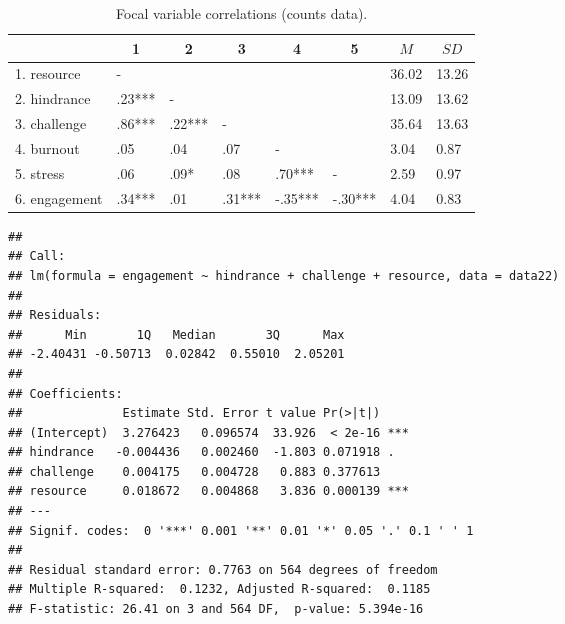 \documentclass[
  man]{apa6}
\begin{document}
\begin{table}[tbp]

\begin{center}
\begin{threeparttable}

\caption{\label{tab:correlation_table}Focal variable correlations (counts data).}

\begin{tabular}{llllllll}
\toprule
 & \multicolumn{1}{c}{1} & \multicolumn{1}{c}{2} & \multicolumn{1}{c}{3} & \multicolumn{1}{c}{4} & \multicolumn{1}{c}{5} & \multicolumn{1}{c}{$M$} & \multicolumn{1}{c}{$SD$}\\
\midrule
1. resource & - &  &  &  &  & 36.02 & 13.26\\
2. hindrance & .23*** & - &  &  &  & 13.09 & 13.62\\
3. challenge & .86*** & .22*** & - &  &  & 35.64 & 13.63\\
4. burnout & .05 & .04 & .07 & - &  & 3.04 & 0.87\\
5. stress & .06 & .09* & .08 & .70*** & - & 2.59 & 0.97\\
6. engagement & .34*** & .01 & .31*** & -.35*** & -.30*** & 4.04 & 0.83\\
\bottomrule
\end{tabular}

\end{threeparttable}
\end{center}

\end{table}

\begin{verbatim}
## 
## Call:
## lm(formula = engagement ~ hindrance + challenge + resource, data = data22)
## 
## Residuals:
##      Min       1Q   Median       3Q      Max 
## -2.40431 -0.50713  0.02842  0.55010  2.05201 
## 
## Coefficients:
##              Estimate Std. Error t value Pr(>|t|)    
## (Intercept)  3.276423   0.096574  33.926  < 2e-16 ***
## hindrance   -0.004436   0.002460  -1.803 0.071918 .  
## challenge    0.004175   0.004728   0.883 0.377613    
## resource     0.018672   0.004868   3.836 0.000139 ***
## ---
## Signif. codes:  0 '***' 0.001 '**' 0.01 '*' 0.05 '.' 0.1 ' ' 1
## 
## Residual standard error: 0.7763 on 564 degrees of freedom
## Multiple R-squared:  0.1232, Adjusted R-squared:  0.1185 
## F-statistic: 26.41 on 3 and 564 DF,  p-value: 5.394e-16
\end{verbatim}
\end{document}
